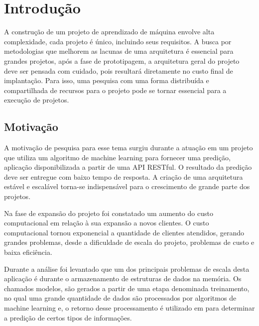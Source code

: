
\chapter{\textbf{Introdução}} %

A construção de um projeto de aprendizado de máquina envolve alta complexidade, cada projeto é único, incluindo seus requisitos. A busca por metodologias que melhorem as lacunas de uma arquitetura é essencial para grandes projetos, após a fase de prototipagem, a arquitetura geral do projeto deve ser pensada com cuidado, pois resultará diretamente no custo final de implantação. Para isso, uma pesquisa com uma forma distribuída e compartilhada de recursos para o projeto pode se tornar essencial para a execução de projetos.

\section{Motivação}

A motivação de pesquisa para esse tema surgiu durante a atuação em um projeto que utiliza um algoritmo de machine learning para fornecer uma  predição, aplicação disponibilizada a partir de uma API RESTful. O resultado da predição deve ser entregue com baixo tempo de resposta. A criação de uma arquitetura estável e escalável torna-se indispensável para o crescimento de grande parte dos projetos.\par
Na fase de expansão do projeto foi constatado um aumento do custo computacional em relação à sua expansão a novos clientes. O custo computacional tornou exponencial a quantidade de clientes atendidos, gerando grandes problemas, desde a dificuldade de escala do projeto, problemas de custo e baixa eficiência.\par
Durante a análise foi levantado que um dos principais problemas de escala desta aplicação é durante o armazenamento de estruturas de dados na memória. Os chamados modelos, são gerados a partir de uma etapa denominada treinamento, no qual uma grande quantidade de dados são processados por algoritmos de machine learning e, o retorno desse processamento é utilizado em para determinar a predição de certos tipos de informações.\par

